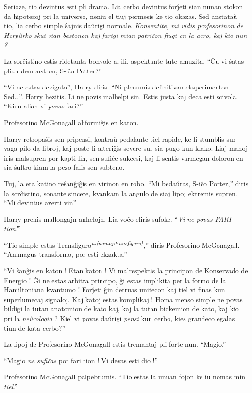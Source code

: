 Serioze, tio devintus esti pli drama. Lia cerbo devintus forĵeti
sian nunan stokon da hipotezoj pri la universo, neniu el tiuj permesis
ke tio okazas. Sed anstataŭ tio, lia cerbo simple ŝajnis daŭrigi
normale. \emph{Konsentite, mi vidis profesorinon de Herpŭrko skui
sian bastonon kaj farigi mian patriĉon flugi en la aero, kaj kio nun ?}

La sorĉistino estis ridetanta bonvole al ili, aspektante tute amuzita. ``Ĉu
vi ŝatas plian demonstron, S-iĉo Potter?''

``Vi ne estas devigata'', Harry diris. ``Ni plenumis definitivan
eksperimenton. Sed\ldots''. Harry hezitis. Li ne povis malhelpi sin. Estis
justa kaj deca esti scivola. ``Kion alian vi \emph{povas} fari?''

Profesorino McGonagall aliformiĝis en katon.

Harry retropaŝis sen pripensi, kontraŭ pedalante tiel rapide, ke li
stumblis sur vaga pilo da libroj, kaj poste li alteriĝis severe sur
sia pugo kun klako. Liaj manoj iris malsupren por kapti lin, sen
sufiĉe sukcesi, kaj li sentis varmegan doloron en sia ŝultro kiam la
pezo falis sen subteno.

Tuj, la eta katino reŝanĝiĝis en virinon en robo. ``Mi bedaŭras,
S-iĉo Potter,'' diris la sorĉistino, sonante sincere, kvankam la
angulo de siaj lipoj ektremis supren. ``Mi devintus averti vin''

Harry prenis mallongajn anhelojn. Lia voĉo eliris
sufoke. ``\emph{Vi ne povas FARI tion!}''

``Tio simple estas Transfiguro$^{\textit{a:\ref{nomoj:transfiguro}}}$,'' diris Profesorino McGonagall. ``Animagus transformo, por esti ekzakta.'' 

``Vi ŝanĝis en katon ! Etan katon ! Vi malrespektis la principon de
Konservado de Energio ! Ĝi ne estas arbitra principo, ĝi estas
implikita per la formo de la Hamiltoniana kvantumo ! Forĵeti ĝin
detruas unitecon kaj tiel vi finas kun superlumecaj signaloj. Kaj
katoj estas komplikaj ! Homa menso simple ne povas bildigi la tutan
anatomion de kato kaj, kaj la tutan biokemion de kato, kaj kio pri la
\emph{neŭrologio} ? Kiel vi povas daŭrigi \emph{pensi} kun cerbo, kies
grandeco egalas tiun de kata cerbo?''

La lipoj de Profesorino McGonagall estis tremantaj pli forte nun. ``Magio.''

``Magio \emph{ne sufiĉas} por fari tion ! Vi devas esti dio !''

Profesorino McGonagall palpebrumis. ``Tio estas la unuan fojon ke iu nomas min \emph{tiel}.''

